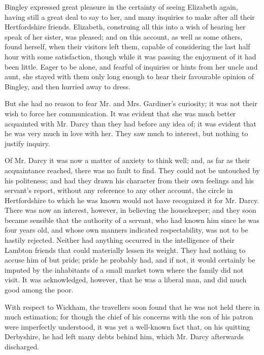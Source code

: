 \documentclass[12pt]{book}
\begin{document}
Bingley expressed great pleasure in the certainty of seeing Elizabeth again, having still a great deal to say to her, and many inquiries to make after all their Hertfordshire friends. Elizabeth, construing all this into a wish of hearing her speak of her sister, was pleased; and on this account, as well as some others, found herself, when their visitors left them, capable of considering the last half hour with some satisfaction, though while it was passing the enjoyment of it had been little. Eager to be alone, and fearful of inquiries or hints from her uncle and aunt, she stayed with them only long enough to hear their favourable opinion of Bingley, and then hurried away to dress.

But she had no reason to fear Mr. and Mrs. Gardiner's curiosity; it was not their wish to force her communication. It was evident that she was much better acquainted with Mr. Darcy than they had before any idea of; it was evident that he was very much in love with her. They saw much to interest, but nothing to justify inquiry.

Of Mr. Darcy it was now a matter of anxiety to think well; and, as far as their acquaintance reached, there was no fault to find. They could not be untouched by his politeness; and had they drawn his character from their own feelings and his servant's report, without any reference to any other account, the circle in Hertfordshire to which he was known would not have recognized it for Mr. Darcy. There was now an interest, however, in believing the housekeeper; and they soon became sensible that the authority of a servant, who had known him since he was four years old, and whose own manners indicated respectability, was not to be hastily rejected. Neither had anything occurred in the intelligence of their Lambton friends that could materially lessen its weight. They had nothing to accuse him of but pride; pride he probably had, and if not, it would certainly be imputed by the inhabitants of a small market town where the family did not visit. It was acknowledged, however, that he was a liberal man, and did much good among the poor.

With respect to Wickham, the travellers soon found that he was not held there in much estimation; for though the chief of his concerns with the son of his patron were imperfectly understood, it was yet a well-known fact that, on his quitting Derbyshire, he had left many debts behind him, which Mr. Darcy afterwards discharged.
\end{document}
